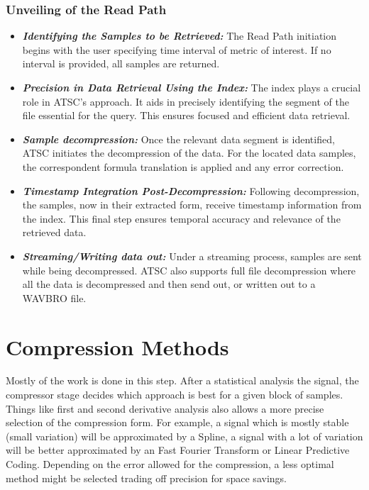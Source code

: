 \documentclass[conference]{IEEEtran}
\begin{document}
\vspace{10pt}
\subsubsection{Unveiling of the Read Path}\label{SCMC}
\begin{itemize}

\item{\textbf{\textit{Identifying the Samples to be Retrieved:}}} The Read Path initiation begins with the user specifying time interval of metric of interest. If no interval is provided, all samples are returned.

\vspace{5pt}
\item{\textbf{\textit{Precision in Data Retrieval Using the Index:}}} The index plays a crucial role in ATSC's approach. It aids in precisely identifying the segment of the file essential for the query. This ensures focused and efficient data retrieval.

\vspace{5pt}
\item{\textbf{\textit{Sample decompression:}}} Once the relevant data segment is identified, ATSC initiates the decompression of the data.
For the located data samples, the correspondent formula translation is applied and any error correction.

\vspace{5pt}
\item{\textbf{\textit{Timestamp Integration Post-Decompression:}}} Following decompression, the samples, now in their extracted form, receive timestamp information from the index. This final step ensures temporal accuracy and relevance of the retrieved data.

\vspace{5pt}
\item{\textbf{\textit{Streaming/Writing data out:}}} Under a streaming process, samples are sent while being decompressed. ATSC also supports full file decompression where all the data is decompressed and then send out, or written out to a WAVBRO file.
\end{itemize}

\section{Compression Methods}

Mostly of the work is done in this step. 
After a statistical analysis the signal, the compressor stage decides which approach is best for a given block of samples.
Things like first and second derivative analysis also allows a more precise selection of the compression form. 
For example, a signal which is mostly stable (small variation) will be approximated by a Spline, a signal with a lot of variation will be better approximated by an Fast Fourier Transform or Linear Predictive Coding.
Depending on the error allowed for the compression, a less optimal method might be selected trading off precision for space savings. 
\end{document}

